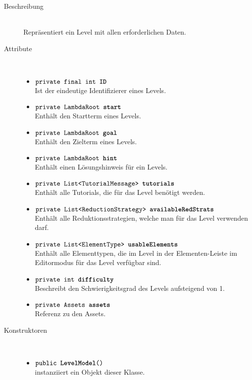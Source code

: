 \begin{description}
\item[Beschreibung] \hfill \\ Repräsentiert ein Level mit allen erforderlichen Daten.

\item[Attribute] \hfill \\
	\vspace{-.8cm}
	\begin{itemize}
		\item $\texttt{private final int \textbf{ID}}$ \\ Ist der eindeutige Identifizierer eines Levels.
		\item $\texttt{private LambdaRoot \textbf{start}}$ \\ Enthält den Startterm eines Levels.
		\item $\texttt{private LambdaRoot \textbf{goal}}$ \\ Enthält den Zielterm eines Levels.
		\item $\texttt{private LambdaRoot \textbf{hint}}$ \\ Enthält einen Lösungshinweis für ein Levels.
		\item $\texttt{private List<TutorialMessage> \textbf{tutorials}}$ \\ Enthält alle Tutorials, die für das Level benötigt werden.
		\item $\texttt{private List<ReductionStrategy> \textbf{availableRedStrats}}$ \\ Enthält alle Reduktionsstrategien, welche man für das Level verwenden darf.
		\item $\texttt{private List<ElementType> \textbf{usableElements}}$ \\ Enthält alle Elementtypen, die im Level in der Elementen-Leiste im Editormodus für das Level verfügbar sind.
		\item $\texttt{private int \textbf{difficulty}}$ \\ Beschreibt den Schwierigkeitsgrad des Levels aufsteigend von 1.
		\item $\texttt{private Assets \textbf{assets}}$ \\ Referenz zu den Assets.
		\end{itemize}
	
\item[Konstruktoren] \hfill \\
	\vspace{-.8cm}
	\begin{itemize}
		\item $\texttt{public \textbf{LevelModel}()}$ \\ instanziiert ein Objekt dieser Klasse.


\end{itemize}
\end{description}
